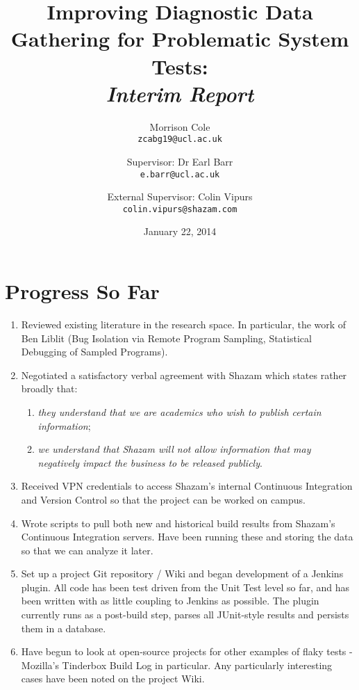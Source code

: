 
\setcounter{oldSectionCounter}{\value{section}}
\setcounter{oldPageCounter}{\value{page}}

\setcounter{section}{0}

\title{
	Improving Diagnostic Data Gathering for Problematic System Tests:\\
	\itshape{Interim Report}
}
\author{
	Morrison Cole\\
	\texttt{zcabg19@ucl.ac.uk}
	\and
	Supervisor: Dr Earl Barr\\
	\texttt{e.barr@ucl.ac.uk}
	\and
	External Supervisor: Colin Vipurs\\
	\texttt{colin.vipurs@shazam.com}
}
\date{January 22, 2014}

\maketitle

\section{Progress So Far}

\begin{enumerate}
	\item{
		Reviewed existing literature in the research space. In particular, the work of Ben Liblit (Bug Isolation via Remote Program Sampling, Statistical Debugging of Sampled Programs).
	}
	\item{
		Negotiated a satisfactory verbal agreement with Shazam which states rather broadly that:
		\begin{enumerate}
		\item{\itshape they understand that we are academics who wish to publish certain information};
		\item {\itshape we understand that Shazam will not allow information that may negatively impact the business to be released publicly}.
		\end{enumerate}
	}
	\item{
		Received VPN credentials to access Shazam's internal Continuous Integration and Version Control so that the project can be worked on campus.
	}
	\item{
		Wrote scripts to pull both new and historical build results from Shazam's Continuous Integration servers. Have been running these and storing the data so that we can analyze it later.
	}
	\item{
		Set up a project Git repository / Wiki and began development of a Jenkins plugin. All code has been test driven from the Unit Test level so far, and has been written with as little coupling to Jenkins as possible. The plugin currently runs as a post-build step, parses all JUnit-style results and persists them in a database.
	}
	\item{
		Have begun to look at open-source projects for other examples of flaky tests - Mozilla's Tinderbox Build Log in particular. Any particularly interesting cases have been noted on the project Wiki.
	}
\end{enumerate}

